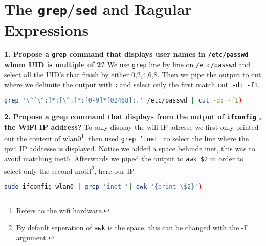 \documentclass[a4paper,oneside,onecolumn]{article}
\newcommand{\code}[1]{\colorbox{codegray}{\texttt{#1}}}
\begin{document}
\section*{The \code{grep}/\code{sed} and Ragular Expressions}

\noindent 
\textbf{1. Propose a \code{grep} command that displays user names in \texttt{/etc/passwd}
whom UID is multiple of 2?}
\newline
\newline
We use \code{grep} line by line on \texttt{/etc/passwd} and select all the UID's that finish by either 0,2,4,6,8. Then we pipe the output to cut where we delimite the output with \textbf{:} and select only the first match \code{cut -d: -f1}.
\begin{lstlisting}[language=bash,caption={bash version}]
grep '\^[\^:]*:[\^:]*:[0-9]*[02468]:.' /etc/passwd | cut -d: -f1)
\end{lstlisting}
\noindent
\textbf{2. Propose a grep command that displays  from the output of \code{ifconfig}
, the WiFi IP address?}
\newline
\newline
To only display the wifi IP adresse we first only printed out the content of wlan0\footnote{Refers to the wifi hardware.}, then used \code{grep 'inet } to select the line where the ipv4 IP addresse is displayed. Notice we added a space behinde inet, this was to avoid matching inet6. Afterwards we piped the output to \code{awk \$2} in order to select only the second motif\footnote{By default seperation of \code{awk} is the space, this can be changed with the -F argument.}, here our IP.
\begin{lstlisting}[language=bash,caption={bash version}]
sudo ifconfig wlan0 | grep 'inet '| awk '{print \$2}')
\end{lstlisting}

\noindent
\end{document}
